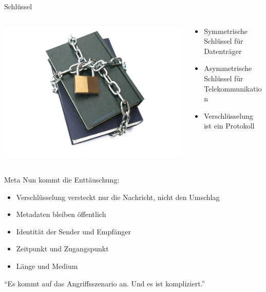 \documentclass[aspectratio=1610]{beamer}
\renewcommand{\quote}[2]
{
  \begin{exampleblock}{}
    {\large “#1”}
    \vskip5mm
    \hspace*\fill{\small--- #2}
  \end{exampleblock}
}
\begin{document}
  \begin{frame}{Schlüssel}
    \begin{columns}
      \begin{column}{.5\textwidth}
        \includegraphics[width=\textwidth]{security.jpg}
      \end{column}
      \begin{column}{.5\textwidth}
        \begin{itemize}
          \item Symmetrische Schlüssel für Datenträger
          \item Asymmetrische Schlüssel für Telekommunikation
          \item Verschlüsselung ist ein Protokoll
        \end{itemize}
      \end{column}
    \end{columns}
  \end{frame}

  \begin{frame}{Meta}
    Nun kommt die Enttäuschung:
    \pause
    \begin{itemize}
      \item Verschlüsselung versteckt nur die Nachricht, nicht den Umschlag
      \item Metadaten bleiben öffentlich
    \end{itemize}
    \pause
    \begin{itemize}
      \item Identität der Sender und Empfänger
      \item Zeitpunkt und Zugangspunkt
      \item Länge und Medium
    \end{itemize}
    \pause
    \quote{Es kommt auf das Angriffsszenario an. Und es ist kompliziert.}{EFF}
  \end{frame}
\end{document}
